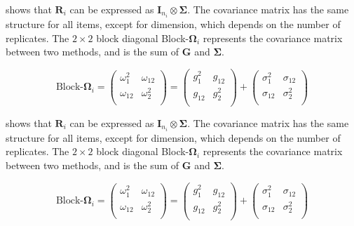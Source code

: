 \documentclass[12pt, a4paper]{report}
\theoremstyle{plain}
\theoremstyle{definition}
\theoremstyle{remark}
\begin{document}
\citet{hamlett} shows that $\boldsymbol{R}_{i}$  can be expressed as $\boldsymbol{I}_{n_{i}} \otimes \boldsymbol{\Sigma}$. The covariance matrix has the same structure for all items, except for dimension, which depends on the number of replicates. The $2 \times 2$ block diagonal Block-$\boldsymbol{\Omega}_{i}$ represents the covariance matrix between two methods, and is the sum of $\boldsymbol{G}$ and $\boldsymbol{\Sigma}$.

\[ \textrm{Block-}\boldsymbol{\Omega}_{i}  = \left(\begin{array}{cc}
\omega^2_1  & \omega_{12} \\
\omega_{12} & \omega^2_2 \\
\end{array}  \right)
=  \left(
\begin{array}{cc}
g^2_1  & g_{12} \\
g_{12} & g^2_2 \\
\end{array} \right)+
\left(
\begin{array}{cc}
\sigma^2_1  & \sigma_{12} \\
\sigma_{12} & \sigma^2_2 \\
\end{array}\right)
\]


\citet{hamlett} shows that $\boldsymbol{R}_{i}$  can be expressed as $\boldsymbol{I}_{n_{i}} \otimes \boldsymbol{\Sigma}$. The covariance matrix has the same structure for all items, except for dimension, which depends on the number of replicates. The $2 \times 2$ block diagonal Block-$\boldsymbol{\Omega}_{i}$ represents the covariance matrix between two methods, and is the sum of $\boldsymbol{G}$ and $\boldsymbol{\Sigma}$.

\[ \textrm{Block-}\boldsymbol{\Omega}_{i}  = \left(\begin{array}{cc}
\omega^2_1  & \omega_{12} \\
\omega_{12} & \omega^2_2 \\
\end{array}  \right)
=  \left(
\begin{array}{cc}
g^2_1  & g_{12} \\
g_{12} & g^2_2 \\
\end{array} \right)+
\left(
\begin{array}{cc}
\sigma^2_1  & \sigma_{12} \\
\sigma_{12} & \sigma^2_2 \\
\end{array}\right)
\]
\end{document}
